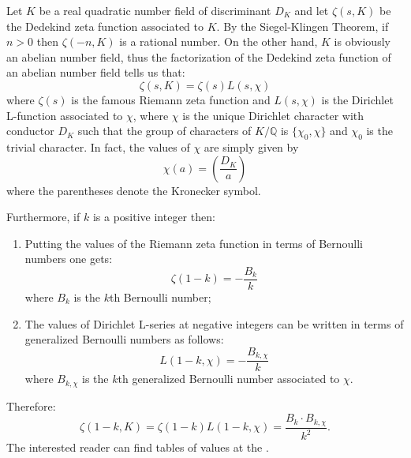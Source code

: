 \documentclass[12pt]{article}
\theoremstyle{definition}
\newcommand{\Rats}{\mathbb{Q}}
\begin{document}
Let $K$ be a real quadratic number field of discriminant $D_K$ and let $\zeta(s,K)$ be the Dedekind zeta function associated to $K$. By the Siegel-Klingen Theorem, if $n>0$ then $\zeta(-n,K)$ is a rational number. On the other hand, $K$ is obviously an abelian number field, thus the factorization of the Dedekind zeta function of an abelian number field tells us that:
$$\zeta(s,K)=\zeta(s)L(s,\chi)$$
where $\zeta(s)$ is the famous Riemann zeta function and $L(s,\chi)$ is the Dirichlet L-function associated to $\chi$, where $\chi$ is the unique Dirichlet character with conductor $D_K$ such that the group of characters of $K/\Rats$ is $\{ \chi_0, \chi \}$ and $\chi_0$ is the trivial character. In fact, the values of $\chi$ are simply given by $$\chi(a)=\left(\frac{D_K}{a}\right)$$ where the parentheses denote the Kronecker symbol.

Furthermore, if $k$ is a positive integer then:
\begin{enumerate}
\item Putting the values of the Riemann zeta function in terms of Bernoulli numbers one gets: $$\zeta(1-k)=-\frac{B_k}{k}$$
where $B_k$ is the $k$th Bernoulli number;

\item The values of Dirichlet L-series at negative integers can be written in terms of generalized Bernoulli numbers as follows:
$$L(1-k,\chi)= -\frac{B_{k,\chi}}{k}$$
where $B_{k,\chi}$ is the $k$th generalized Bernoulli number associated to $\chi$.
\end{enumerate}

Therefore:
$$\zeta(1-k,K)=\zeta(1-k)L(1-k,\chi)=\frac{B_k \cdot B_{k,\chi}}{k^2}.$$
The interested reader can find tables of values at the .
\end{document}
